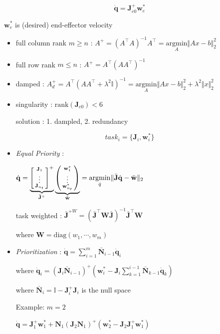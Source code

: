 \documentclass[landscape,a0paper,fontscale=0.285]{baposter} %
\newcommand{\compresslist}{ %
\setlength{\itemsep}{1pt}
\setlength{\parskip}{0pt}
\setlength{\parsep}{0pt}
}
\renewenvironment{bmatrix}{\left[\begin{smallmatrix}}{\end{smallmatrix}\right]}
\renewenvironment{pmatrix}{\left(\begin{smallmatrix}}{\end{smallmatrix}\right)}
\begin{document}
\begin{poster}
{$$\dot{\mathbf{q}} = \mathbf{J}_{e0}^+\mathbf{w}_e^*$$
 
$\mathbf{w}_e^*$ is (desired) end-effector velocity

\begin{itemize}\compresslist
    \item full column rank $m\ge n$ : $A^+ = (A^\top A)^{-1}A^\top=\underset{A}{\text{argmin}}\Vert Ax-b\Vert_2^2$ 
    \item full row rank $m\le n$ : $A^+ = A^\top (AA^\top)^{-1}$
    \item damped : $A^+_d = A^\top (AA^\top + \lambda^2 \mathbb{I})^{-1}=\underset{A}{\text{argmin}}\Vert Ax-b\Vert_2^2+\lambda^2 \Vert x\Vert_2^2$
    \item singularity : $\text{rank}(\mathbf{J}_{e0})<6$

    solution : 1. dampled, 2. redundancy
\end{itemize}

\colorbox[HTML]{CCFFFF}{}
 $$task_i =\{\mathbf{J}_i, \mathbf{w}_i^*\}$$

\begin{itemize}\compresslist
    \item \textit{Equal Priority} : 
    
    $\dot{\mathbf{q}} =\underbrace{\begin{bmatrix}\mathbf{J}_1\\\vdots\\\mathbf{J}_{n_t}\end{bmatrix}^+}_{\bar{\mathbf{J}}^+}\underbrace{\begin{pmatrix}\mathbf{w}_1^*\\\vdots\\ \mathbf{w}^*_{n_t}\end{pmatrix}}_{\bar{\mathbf{w}}} = \underset{\dot{q}}{\text{argmin}}\Vert \bar{\mathbf{J}}\dot{\mathbf{q}}-\bar{\mathbf{w}}\Vert_2$

       task weighted : $\bar{\mathbf{J}}^{+W} = (\bar{\mathbf{J}}^\top \mathbf{W}\bar{\mathbf{J}})^{-1}\bar{\mathbf{J}}^\top \mathbf{W}$ 
       
       where $\mathbf{W}=\text{diag}(w_1,\cdots,w_m)$
    \item \textit{Prioritization} : $\dot{\mathbf{q}} = \sum_{i=1}^{m}\bar{\mathbf{N}}_{i-1}\dot{\mathbf{q}}_i$ 
    
    where $\dot{\mathbf{q}}_i = (\mathbf{J}_i\bar{\mathbf{N}}_{i-1})^+\left(\mathbf{w}_i^* - \mathbf{J}_i\sum_{k=1}^{i-1}\bar{\mathbf{N}}_{k-1}\dot{\mathbf{q}}_k\right)$ 
    
    where $\bar{\mathbf{N}}_i=\mathbb{I} - \mathbf{J}_i^+\mathbf{J}_i$ is the null space 
    
    \hspace{-10pt}Example: $m\!=\!2$
    
    $\dot{\mathbf{q}}\!=\!\mathbf{J}_1^+\mathbf{w}_1^* + \mathbf{N}_1(\mathbf{J}_2\mathbf{N}_1)^+(\mathbf{w}_2^* - \mathbf{J}_2\mathbf{J}_1^+\mathbf{w}_1^*)$
\end{itemize}


}




\end{poster}
\end{document}
